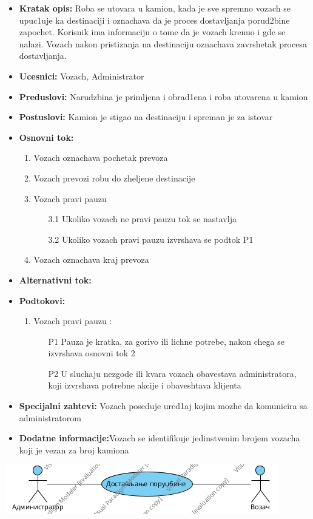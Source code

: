  \begin{itemize}
	\item {\textbf{Kratak opis:} Roba se utovara u kamion, kada je sve spremno vozach se upuc1uje ka destinaciji i oznachava da je proces dostavljanja porud2bine zapochet. Korisnik ima informaciju o tome da je vozach krenuo i gde se nalazi. Vozach nakon pristizanja na destinaciju oznachava zavrshetak procesa
		dostavljanja. }
	\item{\textbf{Ucesnici:} Vozach, Administrator}
	\item{\textbf{Preduslovi:} Narudzbina je primljena i obrad1ena  i roba  utovarena u kamion}
	\item{\textbf{Postuslovi:} Kamion je  stigao na destinaciju i spreman je za istovar}
	\item{\textbf{Osnovni tok:}  \begin{enumerate}
				\item {Vozach oznachava pochetak prevoza}
				\item {Vozach prevozi robu do zheljene destinacije}
				\item{Vozach pravi pauzu \begin{itemize} 
						\item [3.1]{Ukoliko vozach ne pravi pauzu tok se nastavlja }
						\item[3.2]{Ukoliko vozach pravi pauzu izvrshava se podtok P{1}}
				\end{itemize}
			}
				\item {Vozach oznachava kraj prevoza}
	\end{enumerate}}
\item{\textbf{Alternativni tok:} }

\item{\textbf{Podtokovi:}
		\begin{enumerate}
		\item {Vozach pravi pauzu : \begin{itemize}
					\item [P{1}]{Pauza je kratka, za gorivo ili lichne potrebe, nakon chega se izvrshava osnovni tok 2} 
					\item[P{2}]{U sluchaju nezgode ili kvara vozach obavestava administratora, koji izvrshava potrebne akcije i obaveshtava klijenta}
					\end{itemize}}
	\end{enumerate}}
\item{\textbf{Specijalni zahtevi:} Vozach poseduje ured1aj kojim mozhe da komunicira sa administratorom}
\item{\textbf{Dodatne informacije:}Vozach se identifikuje jedinstvenim brojem vozacha koji je vezan za broj kamiona}
\end{itemize}
\includegraphics{Slike/SUdostavljanjePorudzbineUseCase}






